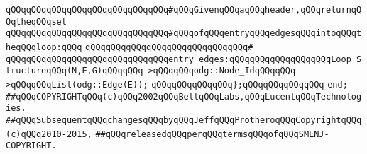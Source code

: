 \newline
\verb|qQQqqQQqqQQqqQQqqQQqqQQqqQQqqQQq#qQQqGivenqQQqaqQQqheader,qQQqreturnqQQqtheqQQqset|\newline
\verb|qQQqqQQqqQQqqQQqqQQqqQQqqQQqqQQq#qQQqofqQQqentryqQQqedgesqQQqintoqQQqtheqQQqloop:qQQq|\newline
\verb|qQQqqQQqqQQqqQQqqQQqqQQqqQQqqQQq#|\newline
\verb|qQQqqQQqqQQqqQQqqQQqqQQqqQQqqQQqentry_edges:qQQqqQQqqQQqqQQqqQQqLoop_StructureqQQq(N,E,G)qQQqqQQq->qQQqqQQqodg::Node_IdqQQqqQQq->qQQqqQQqList(odg::Edge(E));|\newline
\newline
\verb|qQQqqQQqqQQqqQQq};qQQqqQQqqQQqqQQq|\newline
\verb|end;|\newline
\newline
\newline
\verb|##qQQqCOPYRIGHTqQQq(c)qQQq2002qQQqBellqQQqLabs,qQQqLucentqQQqTechnologies.|\newline
\verb|##qQQqSubsequentqQQqchangesqQQqbyqQQqJeffqQQqProtheroqQQqCopyrightqQQq(c)qQQq2010-2015,|\newline
\verb|##qQQqreleasedqQQqperqQQqtermsqQQqofqQQqSMLNJ-COPYRIGHT.|\newline

